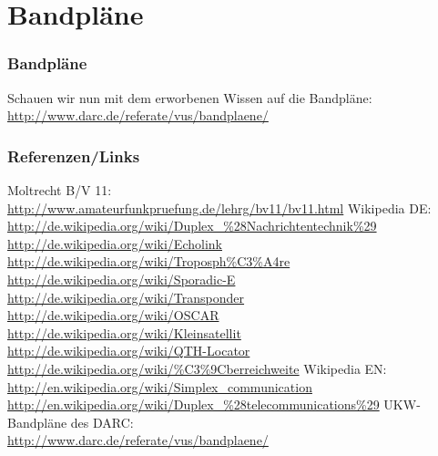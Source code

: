 \section{Bandpläne}

\begin{frame}
    \frametitle{Bandpläne}

    Schauen wir nun mit dem erworbenen Wissen auf die Bandpläne: \\[2em]

    \url{http://www.darc.de/referate/vus/bandplaene/}

\end{frame}


\renewcommand{\refname}{Referenzen}

\begin{frame}
    \frametitle{Referenzen/Links}
    \hypertarget{refs}{}
    \footnotesize

    \begin{thebibliography}{}
         Moltrecht B/V 11: \\
                        \url{http://www.amateurfunkpruefung.de/lehrg/bv11/bv11.html}
            Wikipedia DE: \\
                        \url{http://de.wikipedia.org/wiki/Duplex_\%28Nachrichtentechnik\%29} \\
                        \url{http://de.wikipedia.org/wiki/Echolink} \\
                        \url{http://de.wikipedia.org/wiki/Troposph\%C3\%A4re} \\
                        \url{http://de.wikipedia.org/wiki/Sporadic-E} \\
                        \url{http://de.wikipedia.org/wiki/Transponder} \\
                        \url{http://de.wikipedia.org/wiki/OSCAR} \\
                        \url{http://de.wikipedia.org/wiki/Kleinsatellit} \\
                        \url{http://de.wikipedia.org/wiki/QTH-Locator} \\
                        \url{http://de.wikipedia.org/wiki/\%C3\%9Cberreichweite}
            Wikipedia EN: \\
                        \url{http://en.wikipedia.org/wiki/Simplex_communication} \\
                        \url{http://en.wikipedia.org/wiki/Duplex_\%28telecommunications\%29}
          UKW-Bandpläne des DARC: \\
                        \url{http://www.darc.de/referate/vus/bandplaene/}
    \end{thebibliography} 
   
\end{frame}


